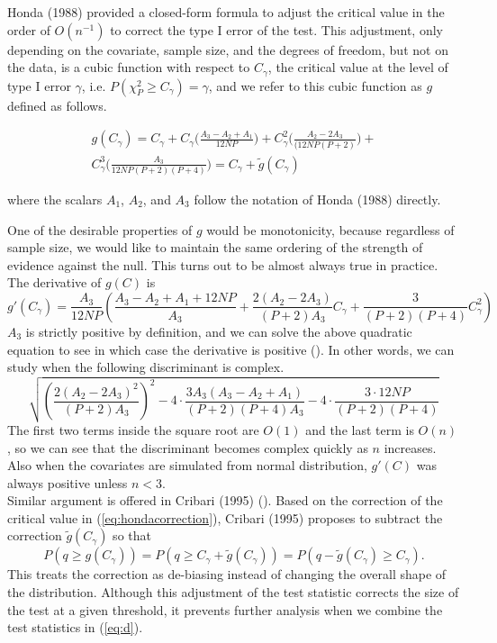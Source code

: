 \documentclass[aap,authoryear, preprint]{imsart}
\numberwithin{equation}{section}
\theoremstyle{plain}
\begin{document}
Honda (1988) provided a closed-form formula to adjust the critical value in the order of $O(n^{-1})$ to correct the type I error of the test. This adjustment, only depending on the covariate, sample size, and the degrees of freedom, but not on the data, is a cubic function with respect to $C_{\gamma}$, the critical value at the level of type I error $\gamma$, i.e. $P(\chi_{P}^2 \geq C_{\gamma}) = \gamma$, and we refer to this cubic function as $g$ defined as follows.

\begin{equation}
    \begin{multlined}
g(C_{\gamma}) = C_{\gamma} + C_{\gamma}\bigg(\frac{A_3 - A_2 + A_1}{12NP}\bigg) + C_{\gamma}^2\bigg(\frac{A_2 - 2A_3}{(12NP(P+2)}\bigg) +\\
C_{\gamma}^3 \bigg(\frac{A_3}{12NP(P+2)(P+4)}\bigg) = C_{\gamma} + \tilde{g}(C_{\gamma})
\end{multlined}
\label{eq:hondacorrection}
\end{equation}

where the scalars $A_1$, $A_2$, and $A_3$ follow the notation of Honda (1988) directly. 

\vspace{5mm}  
One of the desirable properties of $g$ would be monotonicity, because regardless of sample size, we would like to maintain the same ordering of the strength of evidence against the null. This turns out to be almost always true in practice. The derivative of $g(C)$ is 
$$g'(C_{\gamma}) = \frac{A_3}{12NP}\left( \frac{A_3-A_2+A_1+12NP}{A_3} + 
 \frac{2(A_2-2A_3)}{(P+2)A_3}C_{\gamma} + \frac{3}{(P+2)(P+4)}C_{\gamma}^2 \right)$$
$A_3$ is strictly positive by definition, and we can solve the above quadratic equation to see in which case the derivative is positive (\cite{cribari1995improved}). In other words, we can study when the following discriminant is complex.
$$\sqrt{\left(\frac{2(A_2-2A_3)^2}{(P+2)A_3}\right)^2 - 4\cdot\frac{3A_3(A_3-A_2+A_1)}{(P+2)(P+4)A_3} - 4\cdot
\frac{3 \cdot 12NP}{(P+2)(P+4)}}$$
The first two terms inside the square root are $O(1)$ and the last term is $O(n)$, so we can see that the discriminant becomes complex quickly as $n$ increases. Also when the covariates are simulated from normal distribution, $g'(C)$ was always positive unless $n<3$. \\


Similar argument is offered in Cribari (1995) (\cite{cribari1995improved}). Based on the correction of the critical value in (\ref{eq:hondacorrection}), Cribari (1995) proposes to subtract the correction $\tilde{g}(C_{\gamma})$ so that
$$P(q  \geq g(C_{\gamma})) = P(q \geq C_{\gamma} + \tilde{g}(C_{\gamma})) = P(q - \tilde{g}(C_{\gamma}) \geq C_{\gamma}).$$
This treats the correction as de-biasing instead of changing the overall shape of the distribution. Although this adjustment of the test statistic corrects the size of the test at a given threshold, it prevents further analysis when we combine the test statistics in (\ref{eq:d}). 
\end{document}
